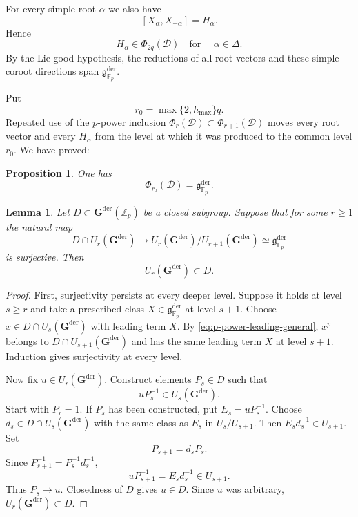 \documentclass[11pt]{amsart}
\numberwithin{equation}{section}
\newcommand{\Fp}{\mathbb F_p}
\newcommand{\Zp}{\mathbb Z_p}
\newcommand{\frakg}{\mathfrak g}
\newcommand{\Gder}{\mathbf G^{\mathrm{der}}}
\newtheorem{proposition}[theorem]{Proposition}
\newtheorem{lemma}[theorem]{Lemma}
\theoremstyle{definition}
\begin{document}
For every simple root $\alpha$ we also have
\[
 [X_\alpha,X_{-\alpha}]=H_\alpha.
\]
Hence
\begin{equation}\label{eq:coroot-depth}
        H_\alpha\in\Phi_{2q}(\mathcal D)
        \quad \text{for }\quad \alpha\in\Delta.
\end{equation}
By the Lie-good hypothesis, the reductions of all root vectors and
these simple coroot directions span
$\frakg^{\mathrm{der}}_{\Fp}$.

Put
\begin{equation}\label{eq:r0}
        r_0=\max\{2,h_{\max}\}q.
\end{equation}
Repeated use of the $p$-power inclusion
$\Phi_r(\mathcal D)\subset\Phi_{r+1}(\mathcal D)$ moves every root
vector and every $H_\alpha$ from the level at which it was produced to
the common level $r_0$.  We have proved:

\begin{proposition}\label{prop:full-lie-layer}
One has
\[
        \Phi_{r_0}(\mathcal D)
        =\frakg^{\mathrm{der}}_{\Fp}.
\]
\end{proposition}


\begin{lemma}\label{lem:successive-lifting}
Let $D\subset\Gder(\Zp)$ be a closed subgroup. Suppose that for some
$r\ge1$ the natural map
\[
        D\cap U_r(\Gder)
        \longrightarrow
        U_r(\Gder)/U_{r+1}(\Gder)
        \simeq\frakg^{\mathrm{der}}_{\Fp}
\]
is surjective. Then
\[
        U_r(\Gder)\subset D.
\]
\end{lemma}

\begin{proof}
First, surjectivity persists at every deeper level.  Suppose it holds
at level $s\ge r$ and take a prescribed class
$X\in\frakg^{\mathrm{der}}_{\Fp}$ at level $s+1$. Choose
$x\in D\cap U_s(\Gder)$ with leading term $X$.  By
\eqref{eq:p-power-leading-general}, $x^p$ belongs to
$D\cap U_{s+1}(\Gder)$ and has the same leading term $X$ at level
$s+1$.  Induction gives surjectivity at every level.

Now fix $u\in U_r(\Gder)$.  Construct elements $P_s\in D$ such that
\[
        uP_s^{-1}\in U_s(\Gder).
\]
Start with $P_r=1$.  If $P_s$ has been constructed, put
$E_s=uP_s^{-1}$.  Choose $d_s\in D\cap U_s(\Gder)$ with the same
class as $E_s$ in $U_s/U_{s+1}$.  Then
$E_sd_s^{-1}\in U_{s+1}$.  Set
\[
        P_{s+1}=d_sP_s.
\]
Since $P_{s+1}^{-1}=P_s^{-1}d_s^{-1}$,
\[
 uP_{s+1}^{-1}=E_sd_s^{-1}\in U_{s+1}.
\]
Thus $P_s\to u$.  Closedness of $D$ gives $u\in D$.  Since $u$ was
arbitrary, $U_r(\Gder)\subset D$.
\end{proof}
\end{document}
